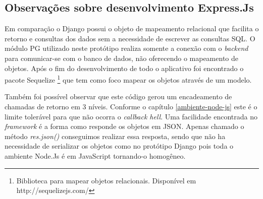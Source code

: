 \subsection{Observações sobre desenvolvimento Express.Js}

  Em comparação o Django possui o objeto de mapeamento relacional que facilita o retorno e consultas dos dados sem a necessidade
  de escrever as consultas SQL. O módulo PG utilizado neste protótipo realiza somente a conexão com o \textit{backend} para comunicar-se com o 
  banco de dados, não oferecendo o mapeamento de objetos. Após o fim do desenvolvimento de todo o aplicativo foi encontrado o
  pacote Sequelize \footnote[13]{Biblioteca para mapear objetos relacionais. Disponível em http://sequelizejs.com/} que tem como 
  foco mapear os objetos através de um modelo.
  
  Também foi possível observar que este código gerou um encadeamento de chamadas de retorno em 3 níveis. Conforme o capítulo \ref{ambiente-node-js}
  este é o limite tolerável para que não ocorra o \textit{callback hell}. Uma facilidade encontrada no \textit{framework} é a forma como responde
  os objetos em JSON. Apenas chamado o método \textit{res.json()} conseguimos realizar essa resposta, sendo que não ha necessidade de serializar
  os objetos como no protótipo Django pois toda o ambiente Node.Js é em JavaScript tornando-o homogêneo.